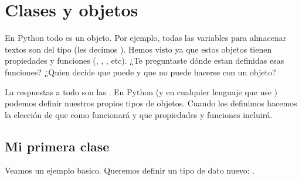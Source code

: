 \documentclass[a4paper,12pt,spanish]{sphinxmanual}
\begin{document}
\chapter{Clases y objetos}
\label{\detokenize{class:clases-y-objetos}}\label{\detokenize{class::doc}}
\sphinxAtStartPar
En Python todo es un objeto. Por ejemplo, todas las variables para almacenar
textos son  del tipo  (les decimos ).
Hemos visto ya que estos objetos tienen propiedades y funciones (,
, , etc).
¿Te preguntaste dónde estan definidas esas funciones?
¿Quien decide que puede y que no puede hacerse con un objeto?

\sphinxAtStartPar
La respuestas a todo son las . En Python (y en cualquier lenguaje que use
) podemos definir nuestros propios tipos de objetos.
Cuando los definimos hacemos la elección de que como funcionará y que propiedades y
funciones incluirá.


\section{Mi primera clase}
\label{\detokenize{class:mi-primera-clase}}
\sphinxAtStartPar
Veamos un ejemplo basico. Queremos definir un tipo de dato nuevo: .
\end{document}
